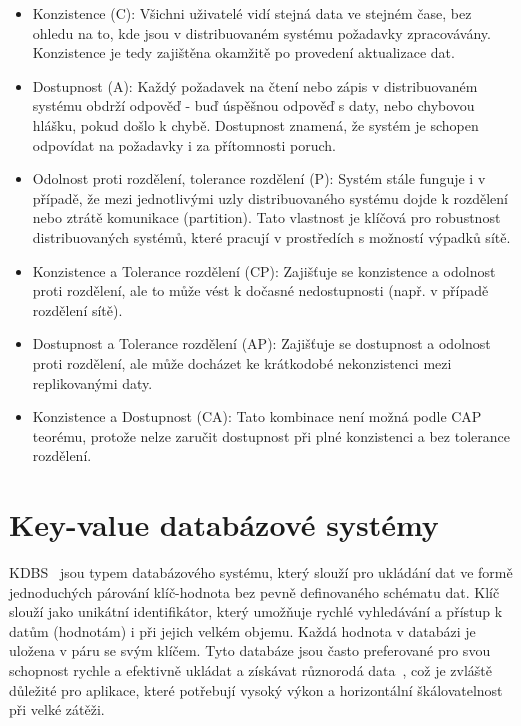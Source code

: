 \documentclass[czech,master,dept460,male,csharp,cpdeclaration]{diploma}
\begin{document}
	\begin{itemize}
		\item Konzistence (C): Všichni uživatelé vidí stejná data ve stejném čase, bez ohledu na to, kde jsou v distribuovaném systému požadavky zpracovávány. Konzistence je tedy zajištěna okamžitě po provedení aktualizace dat.
		\item Dostupnost (A): Každý požadavek na čtení nebo zápis v distribuovaném systému obdrží odpověď - buď úspěšnou odpověď s daty, nebo chybovou hlášku, pokud došlo k chybě. Dostupnost znamená, že systém je schopen odpovídat na požadavky i za přítomnosti poruch.
		\item Odolnost proti rozdělení, tolerance rozdělení (P): Systém stále funguje i v případě, že mezi jednotlivými uzly distribuovaného systému dojde k rozdělení nebo ztrátě komunikace (partition). Tato vlastnost je klíčová pro robustnost distribuovaných systémů, které pracují v prostředích s možností výpadků sítě.
	\end{itemize}
	
	\begin{itemize}
		\item Konzistence a Tolerance rozdělení (CP): Zajišťuje se konzistence a odolnost proti rozdělení, ale to může vést k dočasné nedostupnosti (např. v případě rozdělení sítě).
		\item  Dostupnost a Tolerance rozdělení (AP): Zajišťuje se dostupnost a odolnost proti rozdělení, ale může docházet ke krátkodobé nekonzistenci mezi replikovanými daty.
		\item Konzistence a Dostupnost (CA): Tato kombinace není možná podle CAP teorému, protože nelze zaručit dostupnost při plné konzistenci a bez tolerance rozdělení.
	\end{itemize}
	
	\section{Key-value databázové systémy}
	
	KDBS~\cite{kdbs-oracle, kdbs-redis} jsou typem databázového systému, který slouží pro ukládání dat ve formě jednoduchých párování klíč-hodnota bez pevně definovaného schématu dat. Klíč slouží jako unikátní identifikátor, který umožňuje rychlé vyhledávání a přístup k datům (hodnotám) i při jejich velkém objemu. Každá hodnota v databázi je uložena v páru se svým klíčem. Tyto databáze jsou často preferované pro svou schopnost rychle a efektivně ukládat a získávat různorodá data~\cite{kdbs-quick-fast}, což je zvláště důležité pro aplikace, které potřebují vysoký výkon a horizontální škálovatelnost při velké zátěži.
	
\end{document}
